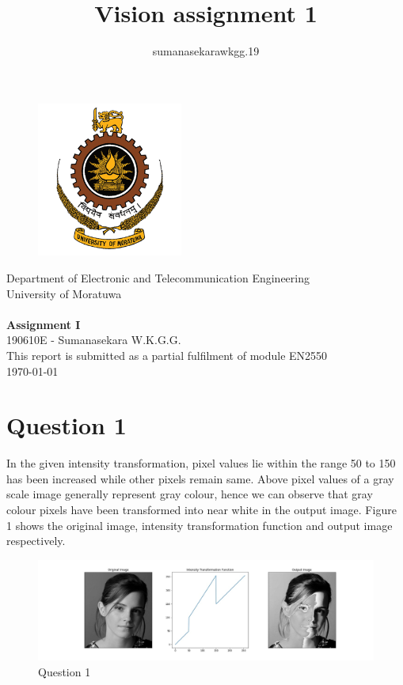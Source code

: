 \documentclass[11pt]{article}
\title{Vision assignment 1}
\author{sumanasekarawkgg.19 }
\begin{document}
\thispagestyle{empty}
\begin{center}
   \begin{figure}
   \vspace*{1.5cm}
       \centering
       \includegraphics[width=4.8cm]{Images/uom.png}
   \end{figure}
   
   Department of Electronic and Telecommunication Engineering \\ University of Moratuwa \\
   \vspace{2cm}
   {\fontsize{14}{17}\selectfont\textbf{\\Assignment I\\}}
    \vspace{8cm}
    190610E - Sumanasekara W.K.G.G. 
   \vspace{3cm}
   \\This report is submitted as a partial fulfilment of module EN2550
   \vspace{0.5cm} \\
   \today
\end{center}

\newpage
\clearpage
{} 

\section*{Question 1}

In the given intensity transformation, pixel values lie within the range 50 to 150 has been increased while other pixels remain same. 
Above pixel values of a gray scale image generally represent gray colour, hence we can observe that gray colour pixels have been 
transformed into near white in the output image. Figure 1 shows the original image, intensity transformation function and output image 
respectively.

\begin{figure}[!h]
    \centering
    \includegraphics[width=\textwidth]{Images/1.jpg}
    \caption{Question 1}
\end{figure}
\end{document}
